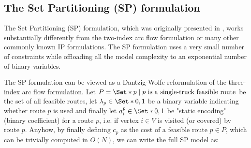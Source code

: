\begin{comment}
There's an important observation to be made on constraint \eqref{eq:three-index-flow-tour-starts-and-ends-at-depot}.
By using the equality sign, we're forcing solutions to use all the available $K$ trucks, even though better solutions making use of less trucks may exist.
In our case, we decided to fix the number of routes in the CVRP formulation since it seems that this is the most agreed contention in the literature.
Some authors, instead, prefer a different CVRP formulation, by not fixing the number of routes, and by essentially using a less-than-sign in place of the equality.

The three-index flow formulation is usually solved through the usage of a standard Branch \& Cut framework approach.
Modern CVRP solvers, instead, rely on a different mathematical formulation and employ a  mostly Branch \& Price based-approach (although hybridization are also possible).
The Set Partitioning (SP) formulation is the main starting point employed by Branch \& Price solvers.
In this thesis we will mostly concentrate on Branch \& Price approaches for the CVRP.
In the next subsection we will introduce the set partitioning formulation, and in the remainder of the section
we will briefly introduce the key ingredients of modern Branch \& Price solvers.

\end{comment}

\subsection{The Set Partitioning (SP) formulation}
\label{sec:intro-set-partition-formulation}

The Set Partitioning (SP) formulation, which was originally presented in \textcite{balinski1964},
works substantially differently from the two-index arc flow formulation or many other commonly known IP formulations.
The SP formulation uses a very small number of constraints while offloading all the model complexity to an exponential number of binary variables.


The SP formulation can be viewed as a Dantzig-Wolfe reformulation \parencite{dantzig1960} of the three-index arc flow formulation.
Let $P = \Set*{p \mid p\ \text{is a single-truck feasible route}}$ be the set of all feasible routes,
let $\lambda_p \in \Set*{0, 1}$ be a binary variable indicating whether route $p$ is used
and finally let $a_{i}^p \in \Set*{0, 1}$ be "static encoding" (binary coefficient) for a route $p$, i.e. if vertex $i \in V$ is visited (or covered) by route $p$.
Anyhow, by finally defining $c_p$ as the cost of a feasible route $p \in P$,
which can be trivially computed in $O(N)$,
we can write the full SP model as:


